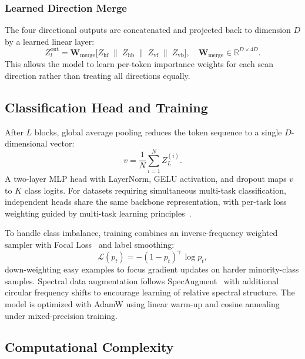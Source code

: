 \documentclass[runningheads]{llncs}
\begin{document}
\subsubsection{Learned Direction Merge}

The four directional outputs are concatenated and projected back to
dimension $D$ by a learned linear layer:
\begin{equation}
  Z_{l}^{\text{out}} =
  \mathbf{W}_{\text{merge}}
  \bigl[Z_{\text{hf}} \;\|\; Z_{\text{hb}} \;\|\;
        Z_{\text{vf}} \;\|\; Z_{\text{vb}}\bigr],
  \quad \mathbf{W}_{\text{merge}} \in \mathbb{R}^{D \times 4D}.
\end{equation}
This allows the model to learn per-token importance weights for each scan
direction rather than treating all directions equally.

\subsection{Classification Head and Training}

After $L$ blocks, global average pooling reduces the token sequence to a
single $D$-dimensional vector:
\begin{equation}
  v = \frac{1}{N}\sum_{i=1}^{N} Z_L^{(i)}.
\end{equation}
A two-layer MLP head with LayerNorm, GELU activation, and dropout maps $v$
to $K$ class logits. For datasets requiring simultaneous multi-task
classification, independent heads share the same backbone representation,
with per-task loss weighting guided by multi-task learning
principles~\cite{ref29}.

To handle class imbalance, training combines an inverse-frequency weighted
sampler with Focal Loss~\cite{ref40} and label smoothing:
\begin{equation}
  \mathcal{L}(p_t) = -(1 - p_t)^{\gamma}\,\log p_t,
\end{equation}
down-weighting easy examples to focus gradient updates on harder
minority-class samples. Spectral data augmentation follows
SpecAugment~\cite{ref39} with additional circular frequency
shifts to encourage learning of relative spectral structure. The model is
optimized with AdamW using linear warm-up and cosine annealing under
mixed-precision training.

\subsection{Computational Complexity}
\end{document}
